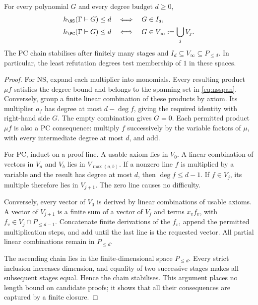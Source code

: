 \begin{proposition}\label{prop:pc-closure}
For every polynomial $G$ and every degree budget $d\ge0$,
\[
 \begin{aligned}
 h_{\NS}(\Gamma\vdash G)\le d&\quad\Longleftrightarrow\quad G\in I_d,\\
 h_{\PC}(\Gamma\vdash G)\le d&\quad\Longleftrightarrow\quad
                       G\in V_\infty:=\bigcup_jV_j.
 \end{aligned}
\]
The PC chain stabilises after finitely many stages and
$I_d\subseteq V_\infty\subseteq P_{\le d}$. In particular, the least
refutation degrees test membership of $1$ in these spaces.
\end{proposition}
\begin{proof}
For NS, expand each multiplier into monomials. Every resulting product
$\mu f$ satisfies the degree bound and belongs to the spanning set in
\eqref{eq:nsspan}. Conversely, group a finite linear combination of
these products by axiom. Its multiplier $a_f$ has degree at most
$d-\deg f$, giving the required identity with right-hand side $G$.
The empty combination gives $G=0$. Each permitted product $\mu f$ is
also a PC consequence: multiply $f$ successively by the variable
factors of $\mu$, with every intermediate degree at most $d$, and add.

For PC, induct on a proof line. A usable axiom lies in $V_0$. A linear
combination of vectors in $V_a$ and $V_b$ lies in $V_{\max(a,b)}$.
If a nonzero line $f$ is multiplied by a variable and the result has
degree at most $d$, then $\deg f\le d-1$. If $f\in V_j$, its multiple
therefore lies in $V_{j+1}$. The zero line causes no difficulty.

Conversely, every vector of $V_0$ is derived by linear combinations of
usable axioms. A vector of $V_{j+1}$ is a finite sum of a vector of
$V_j$ and terms $x_vf_v$, with $f_v\in V_j\cap P_{\le d-1}$.
Concatenate finite derivations of the $f_v$, append the permitted
multiplication steps, and add until the last line is the requested
vector. All partial linear combinations remain in $P_{\le d}$.

The ascending chain lies in the finite-dimensional space $P_{\le d}$.
Every strict inclusion increases dimension, and equality of two
successive stages makes all subsequent stages equal. Hence the chain
stabilises. This argument places no length bound on candidate proofs;
it shows that all their consequences are captured by a finite closure.
\end{proof}

